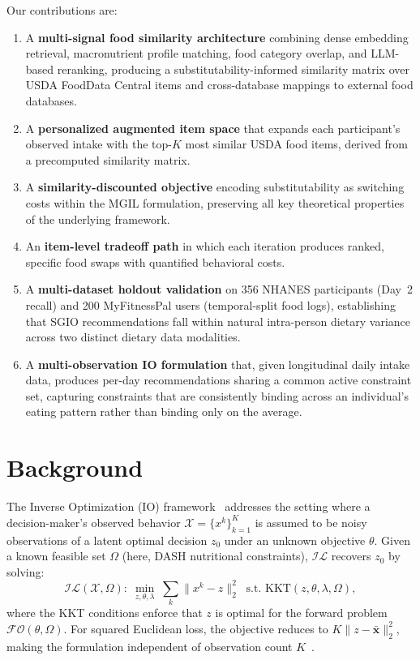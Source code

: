 \documentclass[journal]{IEEEtran}
\newcommand{\IL}{\mathcal{IL}}
\newcommand{\FO}{\mathcal{FO}}
\newcommand{\xbar}{\bar{\mathbf{x}}}
\begin{document}
Our contributions are:
\begin{enumerate}
\item A \textbf{multi-signal food similarity architecture} combining
dense embedding retrieval, macronutrient profile matching, food
category overlap, and LLM-based reranking, producing a
substitutability-informed similarity matrix over USDA FoodData Central
items and cross-database mappings to external food databases.
\item A \textbf{personalized augmented item space} that expands each
participant's observed intake with the top-$K$ most similar USDA food
items, derived from a precomputed similarity matrix.
\item A \textbf{similarity-discounted objective} encoding substitutability
as switching costs within the MGIL formulation, preserving all key
theoretical properties of the underlying framework.
\item An \textbf{item-level tradeoff path} in which each iteration
produces ranked, specific food swaps with quantified behavioral costs.
\item A \textbf{multi-dataset holdout validation} on 356 NHANES
participants (Day~2 recall) and 200 MyFitnessPal users (temporal-split
food logs), establishing that SGIO recommendations fall within natural
intra-person dietary variance across two distinct dietary data modalities.
\item A \textbf{multi-observation IO formulation} that, given
longitudinal daily intake data, produces per-day recommendations sharing
a common active constraint set, capturing constraints that are
consistently binding across an individual's eating pattern rather than
binding only on the average.
\end{enumerate}

\section{Background}
\label{sec:background}

The Inverse Optimization (IO) framework~\cite{ahmadi2024IL} addresses the
setting where a decision-maker's observed behavior
$\mathcal{X} = \{x^k\}_{k=1}^K$ is assumed to be noisy observations
of a latent optimal decision $z_0$ under an unknown objective $\theta$.
Given a known feasible set $\Omega$ (here, DASH nutritional constraints),
$\IL$ recovers $z_0$ by solving:
\begin{equation}
\IL(\mathcal{X},\Omega):\;\min_{z,\theta,\lambda}\;\sum_k\|x^k - z\|_2^2
\;\;\text{s.t. KKT}(z,\theta,\lambda,\Omega),
\label{eq:IL}
\end{equation}
where the KKT conditions enforce that $z$ is optimal for the forward
problem $\FO(\theta,\Omega)$. For squared Euclidean loss, the objective
reduces to $K\|z-\xbar\|_2^2$, making the formulation independent of
observation count $K$~\cite{ahmadi2024IL}.
\end{document}

